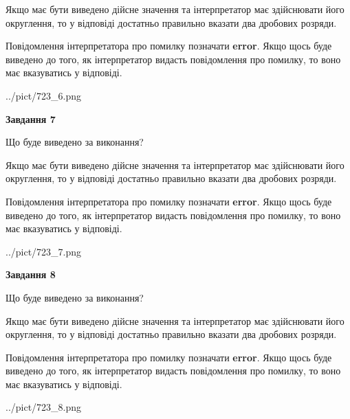 \documentclass[12pt, ukrainian]{article}
\begin{document}
{\begin {Large}
Якщо має бути виведено дійсне значення та інтерпретатор має здійснювати його округлення, 
то у відповіді достатньо правильно вказати два дробових розряди.

Повідомлення інтерпретатора про помилку позначати \textbf{error}.
Якщо щось буде виведено до того, як інтерпретатор видасть повідомлення про помилку, 
то воно має вказуватись у відповіді. \par

\begin{center}
	{../pict/723_6.png}
\end{center}
\newpage

{\begin {center}\textbf{Завдання 7}\end {center}}\par
Що буде виведено за виконання? \par

Якщо має бути виведено дійсне значення та інтерпретатор має здійснювати його округлення, 
то у відповіді достатньо правильно вказати два дробових розряди.

Повідомлення інтерпретатора про помилку позначати \textbf{error}.
Якщо щось буде виведено до того, як інтерпретатор видасть повідомлення про помилку, 
то воно має вказуватись у відповіді. \par

\begin{center}
	{../pict/723_7.png}
\end{center}
\newpage

{\begin {center}\textbf{Завдання 8}\end {center}}\par
Що буде виведено за виконання? \par

Якщо має бути виведено дійсне значення та інтерпретатор має здійснювати його округлення, 
то у відповіді достатньо правильно вказати два дробових розряди.

Повідомлення інтерпретатора про помилку позначати \textbf{error}.
Якщо щось буде виведено до того, як інтерпретатор видасть повідомлення про помилку, 
то воно має вказуватись у відповіді. \par

\begin{center}
	{../pict/723_8.png}
\end{center}
\newpage


\end{Large}}
\end{document}
